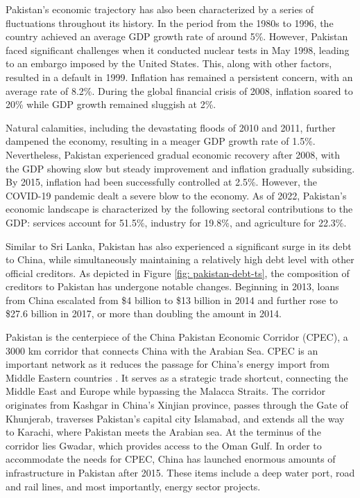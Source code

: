 Pakistan's economic trajectory has also been characterized by a series of fluctuations throughout its history. In the period from the 1980s to 1996, the country achieved an average GDP growth rate of around 5\%. However, Pakistan faced significant challenges when it conducted nuclear tests in May 1998, leading to an embargo imposed by the United States. This, along with other factors, resulted in a default in 1999. Inflation has remained a persistent concern, with an average rate of 8.2\%. During the global financial crisis of 2008, inflation soared to 20\% while GDP growth remained sluggish at 2\%.

Natural calamities, including the devastating floods of 2010 and 2011, further dampened the economy, resulting in a meager GDP growth rate of 1.5\%. Nevertheless, Pakistan experienced gradual economic recovery after 2008, with the GDP showing slow but steady improvement and inflation gradually subsiding. By 2015, inflation had been successfully controlled at 2.5\%. However, the COVID-19 pandemic dealt a severe blow to the economy. As of 2022, Pakistan's economic landscape is characterized by the following sectoral contributions to the GDP: services account for 51.5\%, industry for 19.8\%, and agriculture for 22.3\%.

Similar to Sri Lanka, Pakistan has also experienced a significant surge in its debt to China, while simultaneously maintaining a relatively high debt level with other official creditors. As depicted in Figure \ref{fig: pakistan-debt-ts}, the composition of creditors to Pakistan has undergone notable changes.  Beginning in 2013, loans from China escalated from \$4 billion to \$13 billion in 2014 and further rose to \$27.6 billion in 2017, or more than doubling the amount in 2014.


Pakistan is the centerpiece of the China Pakistan Economic Corridor (CPEC), a 3000 km corridor that connects China with the Arabian Sea.
CPEC is an important network as it reduces the passage for China's energy import from Middle Eastern countries \citep*{CPEC-wiki}.
It serves as a strategic trade shortcut, connecting the Middle East and Europe while bypassing the Malacca Straits. The corridor originates from Kashgar in China's Xinjian province, passes through the Gate of Khunjerab, traverses Pakistan's capital city Islamabad, and extends all the way to Karachi, where Pakistan meets the Arabian sea. At the terminus of the corridor lies Gwadar, which provides access to the Oman Gulf.
In order to accommodate the needs for CPEC, China has launched enormous amounts of infrastructure in Pakistan after 2015. These items include a deep water port, road and rail lines, and most importantly, energy sector projects.

